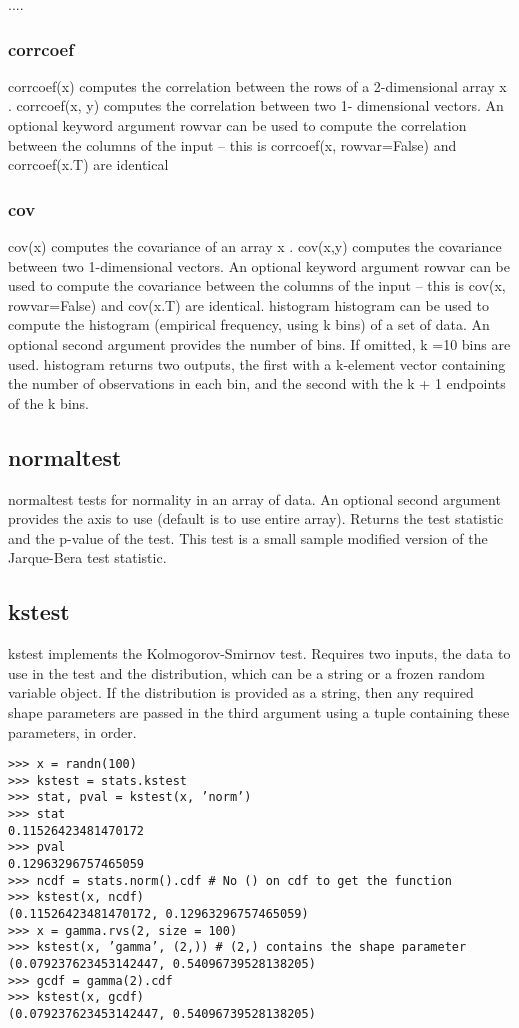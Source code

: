 \documentclass[KSmain.tex]{subfiles}
\begin{document}
....

\subsubsection{corrcoef}
corrcoef(x) computes the correlation between the rows of a 2-dimensional array x . corrcoef(x, y) computes
the correlation between two 1- dimensional vectors. An optional keyword argument rowvar can be
used to compute the correlation between the columns of the input – this is corrcoef(x, rowvar=False)
and corrcoef(x.T) are identical



\subsubsection{cov}
cov(x) computes the covariance of an array x . cov(x,y) computes the covariance between two 1-dimensional
vectors. An optional keyword argument rowvar can be used to compute the covariance between the
columns of the input – this is cov(x, rowvar=False) and cov(x.T) are identical.
histogram
histogram can be used to compute the histogram (empirical frequency, using k bins) of a set of data. An
optional second argument provides the number of bins. If omitted, k =10 bins are used. histogram returns
two outputs, the first with a k-element vector containing the number of observations in each bin, and the
second with the k + 1 endpoints of the k bins.
\newpage

\subsection{normaltest}
normaltest tests for normality in an array of data. An optional second argument provides the axis to use
(default is to use entire array). Returns the test statistic and the p-value of the test. This test is a small
sample modified version of the Jarque-Bera test statistic.
\subsection{kstest}
kstest implements the Kolmogorov-Smirnov test. Requires two inputs, the data to use in the test and the
distribution, which can be a string or a frozen random variable object. If the distribution is provided as
a string, then any required shape parameters are passed in the third argument using a tuple containing
these parameters, in order.
\begin{verbatim}
>>> x = randn(100)
>>> kstest = stats.kstest
>>> stat, pval = kstest(x, ’norm’)
>>> stat
0.11526423481470172
>>> pval
0.12963296757465059
>>> ncdf = stats.norm().cdf # No () on cdf to get the function
>>> kstest(x, ncdf)
(0.11526423481470172, 0.12963296757465059)
>>> x = gamma.rvs(2, size = 100)
>>> kstest(x, ’gamma’, (2,)) # (2,) contains the shape parameter
(0.079237623453142447, 0.54096739528138205)
>>> gcdf = gamma(2).cdf
>>> kstest(x, gcdf)
(0.079237623453142447, 0.54096739528138205)
\end{verbatim}
\end{document}
